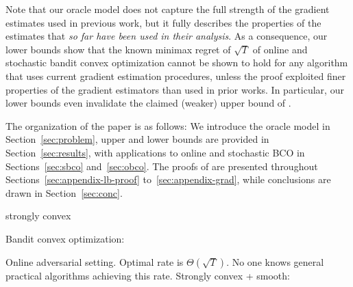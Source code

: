 Note that our oracle model does not capture the full strength of the gradient estimates used in previous work, but it fully describes the properties of the estimates that \emph{so far have been used in their analysis}.
As a consequence, our lower bounds show that the known minimax regret of $\sqrt{T}$ \citep{BubeckDKP15,BuEl15,shamir2012complexity}
of online and stochastic bandit convex optimization
cannot be shown to hold
for any algorithm that uses current gradient estimation procedures, unless the proof exploited finer properties
of the gradient estimators than used in prior works. In particular,
our lower bounds even invalidate the claimed (weaker) upper bound of \citet{DeElKo15}.


The organization of the paper is  as follows: We introduce the oracle model in Section~\ref{sec:problem}, upper and lower bounds are provided in Section~\ref{sec:results}, with applications to online and stochastic BCO in Sections~\ref{sec:sbco} and~\ref{sec:obco}. 
The proofs of are presented throughout Sections~\ref{sec:appendix-lb-proof} to~\ref{sec:appendix-grad}, while conclusions are drawn in Section~\ref{sec:conc}.




strongly convex


Bandit convex optimization:

Online adversarial setting. Optimal rate is $\Theta(\sqrt{T})$.
No one knows general practical algorithms achieving this rate.
Strongly convex + smooth: \cite{hazan2014bandit}

